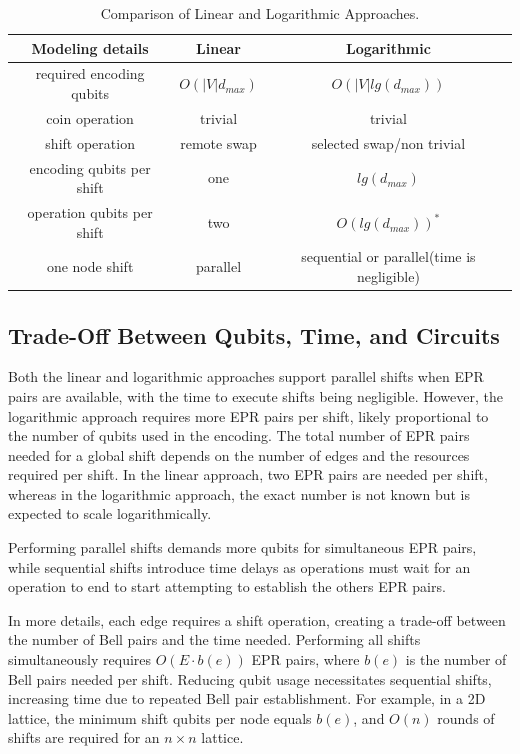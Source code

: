 \documentclass{article}
\begin{document}
		\begin{table}[h!]
			\centering
			\begin{tabular}{|c | c | c|} 
				\hline
				\textbf{Modeling details} & \textbf{Linear} & \textbf{Logarithmic} \\
				\hline
				required encoding qubits & $O(|V|d_{max})$ & $O(|V|lg(d_{max}))$ \\ 
				\hline
				coin operation & trivial & trivial\\ 
				\hline
				shift operation & remote swap & selected swap/non trivial\\
				\hline
				encoding qubits per shift & one & $lg(d_{max})$ \\
				\hline
				operation qubits per shift & two & $O(lg(d_{max}))^{*}$\\
				\hline
				one node shift & parallel & sequential or parallel(time is negligible)\\
				\hline
			\end{tabular}
			\caption{Comparison of Linear and Logarithmic Approaches.}
			\label{tab:comparison}
		\end{table}

	\subsection{Trade-Off Between Qubits, Time, and Circuits}

		Both the linear and logarithmic approaches support parallel shifts when EPR pairs are available, with the time to execute shifts being negligible. However, the logarithmic approach requires more EPR pairs per shift, likely proportional to the number of qubits used in the encoding. The total number of EPR pairs needed for a global shift depends on the number of edges and the resources required per shift. In the linear approach, two EPR pairs are needed per shift, whereas in the logarithmic approach, the exact number is not known but is expected to scale logarithmically.
		
		Performing parallel shifts demands more qubits for simultaneous EPR pairs, while sequential shifts introduce time delays as operations must wait for an operation to end to start attempting to establish the others EPR pairs.
		
		In more details, each edge requires a shift operation, creating a trade-off between the number of Bell pairs and the time needed. Performing all shifts simultaneously requires \( O(E \cdot b(e)) \) EPR pairs, where \( b(e) \) is the number of Bell pairs needed per shift. Reducing qubit usage necessitates sequential shifts, increasing time due to repeated Bell pair establishment. For example, in a 2D lattice, the minimum shift qubits per node equals \( b(e) \), and \( O(n) \) rounds of shifts are required for an \( n \times n \) lattice.
		
\end{document}
